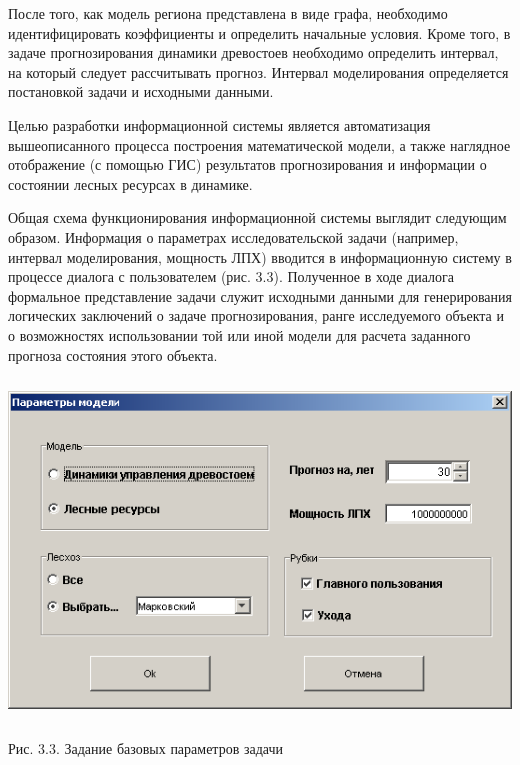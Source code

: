 \documentclass{article}
\begin{document}
После того, как модель региона представлена 
в виде графа, необходимо идентифицировать коэффициенты 
и определить начальные условия. Кроме того, 
в задаче прогнозирования динамики древостоев 
необходимо определить интервал, на который 
следует рассчитывать прогноз. Интервал моделирования 
определяется постановкой задачи и исходными 
данными. 

Целью разработки информационной системы является 
автоматизация вышеописанного процесса построения 
математической модели, а также наглядное отображение 
(с помощью ГИС) результатов прогнозирования 
и информации о состоянии лесных ресурсах в 
динамике.

Общая схема функционирования информационной 
системы выглядит следующим образом. Информация 
о параметрах исследовательской задачи (например, 
интервал моделирования, мощность ЛПХ) вводится 
в информационную систему в процессе диалога 
с пользователем (рис. 3.3). Полученное в ходе диалога 
формальное представление задачи служит исходными 
данными для генерирования логических заключений 
о задаче прогнозирования, ранге исследуемого 
объекта и о возможностях использовании той 
или иной модели для расчета заданного прогноза 
состояния этого объекта.  

\begin{center}
\includegraphics[width=405pt, height=256pt, keepaspectratio=true]{asyaDisser9_3-fig002.png}

Рис. 3.3. Задание базовых параметров задачи 
\end{center}
\end{document}
